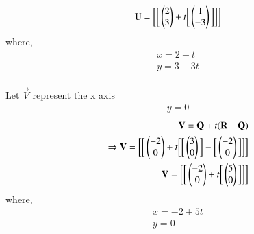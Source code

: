 \documentclass[journal,12pt,twocolumn]{IEEEtran}
\renewcommand\thesection{\arabic{section}}
\begin{document}
\begin{enumerate}[label=\thesection.\arabic*.,ref=\thesection.\theenumi]
\begin{align}
\mathbf{U}=\bigg[\bigg[\begin{pmatrix}2\\3\end{pmatrix} +t\bigg[\begin{pmatrix}1\\-3\end{pmatrix}\bigg]\bigg]\bigg]
\end{align}
where, \begin{align}
    x=2+t\\y=3-3t
\end{align}
\\
Let $\vec{V}$ represent the x axis \begin{align}
    y=0
\end{align}
\begin{align}
    \mathbf{V}=\mathbf{Q}+t(\mathbf{R}-\mathbf{Q})\\
\Rightarrow\mathbf{V}=\bigg[\bigg[\begin{pmatrix}-2\\0\end{pmatrix}+t\bigg[\bigg[\begin{pmatrix}3\\0\end{pmatrix}\bigg]-\bigg[\begin{pmatrix}-2\\0\end{pmatrix}\bigg]\bigg]\bigg]\\
\mathbf{V}=\bigg[\bigg[\begin{pmatrix}-2\\0\end{pmatrix} +t\bigg[\begin{pmatrix}5\\0\end{pmatrix}\bigg]\bigg]\bigg]
\end{align}
where, \begin{align}
    x=-2+5t\\y=0
\end{align}
\end{enumerate}
\end{document}
